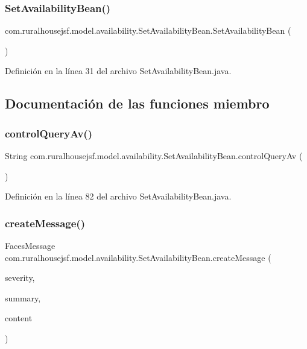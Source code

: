 \subsubsection{\texorpdfstring{SetAvailabilityBean()}{SetAvailabilityBean()}}
{\footnotesize\ttfamily com.\+ruralhousejsf.\+model.\+availability.\+Set\+Availability\+Bean.\+Set\+Availability\+Bean (\begin{DoxyParamCaption}{ }\end{DoxyParamCaption})}



Definición en la línea 31 del archivo Set\+Availability\+Bean.\+java.



\subsection{Documentación de las funciones miembro}
\mbox{\label{a00228_ae291ccc259e4e415f8ec7f52fb4a28da}} 
\subsubsection{\texorpdfstring{controlQueryAv()}{controlQueryAv()}}
{\footnotesize\ttfamily String com.\+ruralhousejsf.\+model.\+availability.\+Set\+Availability\+Bean.\+control\+Query\+Av (\begin{DoxyParamCaption}{ }\end{DoxyParamCaption})}



Definición en la línea 82 del archivo Set\+Availability\+Bean.\+java.

\mbox{\label{a00228_a827001537a7a94df4b1949dc97d9fcf3}} 
\subsubsection{\texorpdfstring{createMessage()}{createMessage()}}
{\footnotesize\ttfamily Faces\+Message com.\+ruralhousejsf.\+model.\+availability.\+Set\+Availability\+Bean.\+create\+Message (\begin{DoxyParamCaption}\item[{Faces\+Message.\+Severity}]{severity,  }\item[{String}]{summary,  }\item[{String}]{content }\end{DoxyParamCaption})\hspace{0.3cm}{\ttfamily [private]}}



